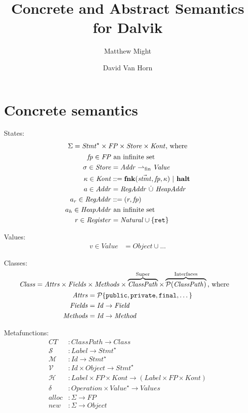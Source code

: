 \documentclass{article}
\title{Concrete and Abstract Semantics for Dalvik}
\author{Matthew Might \and David {Van Horn}}
\newcommand\code[1]{\text{\tt{#1}}}
\newcommand\java[1]{\tt{#1}}
\newcommand\pow{\mathcal{P}}
\newcommand\Attrs{\mathit{Attrs}}
\newcommand\Stmts{\mathit{Stmt}^\star}
\newcommand\FP{\mathit{FP}}
\newcommand\Store{\mathit{Store}}
\newcommand\Kont{\mathit{Kont}}
\newcommand\Time{\mathit{Time}}
\newcommand\CT{\mathit{CT}}
\newcommand\Addr{\mathit{Addr}}
\newcommand\reg[2]{(#1,#2)}
\newcommand\fp{\mathit{fp}}
\newcommand\CP{\mathit{ClassPath}}
\newcommand\fnk{\mathbf{fnk}}
\newcommand\kont{\kappa}
\newcommand\stmts{\vec{\mathit{stmt}}}
\newcommand\s[1]{\mathit{#1}}
\newcommand\store{\sigma}
\newcommand\finmap{\rightharpoonup_{\text{fin}}}
\newcommand\mtk{\mathbf{halt}}
\newcommand\addr{a}
\newcommand\raddr{a_r}
\newcommand\haddr{a_h}
\newcommand\regid{r}
\newcommand\getStmts{\mathcal{S}}
\newcommand\methodStmts{\mathcal{M}}
\newcommand\virtualStmts{\mathcal{V}}
\newcommand\handlers{\mathcal{H}}
\newcommand\alloc{\mathit{alloc}}
\newcommand\new{\mathit{new}}
\newcommand\val{v}
\begin{document}
\maketitle

\section{Concrete semantics}

States:
\begin{gather*}
\Sigma = \Stmts \times \FP \times \Store \times \Kont %
\text{, where}
\\
\begin{align*}
\fp \in \FP &\text{ an infinite set}
\\
\store \in \Store &= \Addr \finmap \s{Value}
\\
\kont \in \Kont &::= \fnk(\stmts, \fp, \kont)\ |\ \mtk
\\
\addr \in \Addr &= \s{RegAddr}\ \dot\cup\ \s{HeapAddr}
\\
\raddr \in \s{RegAddr} &::= \reg\regid\fp
\\
\haddr \in \s{HeapAddr} &\text{ an infinite set}
\\
\regid \in \s{Register} & = \s{Natural} \cup \{ \code{ret} \}
\end{align*}
\end{gather*}

Values:
\begin{align*}
\val \in \s{Value} &= \s{Object} \cup \dots
\end{align*}

Classes:
\begin{gather*}
\begin{align*}
\mathit{Class} &= \Attrs \times 
\s{Fields} \times
\s{Methods} \times
\overbrace{\CP}^{\text{Super}} \times
\overbrace{\pow(\CP)}^{\text{Interfaces}} 
\text{, where}
\end{align*}
\\
\begin{align*}
\Attrs &= \pow\{\java{public}, \java{private}, \java{final}, \dots\}\\
\s{Fields} &= \s{Id} \rightarrow \s{Field}\\
\s{Methods} &= \s{Id} \rightarrow \s{Method}\\
\end{align*}
\end{gather*}


Metafunctions:
\begin{align*}
\CT &: \CP \rightarrow \s{Class}
\\
\getStmts &: \s{Label} \rightarrow \Stmts
\\
\methodStmts &: \s{Id} \rightarrow \Stmts
\\
\virtualStmts &: \s{Id} \times \s{Object} \rightarrow \Stmts
\\
\handlers &: \s{Label} \times \FP \times \Kont
 \rightarrow (\s{Label} \times \FP \times \Kont)
\\
\delta &: \s{Operation} \times \s{Value}^\star \rightarrow \s{Values}
\\
\alloc &: \Sigma \rightarrow \FP
\\
\new &: \Sigma \rightarrow \s{Object}
\end{align*}
\end{document}
